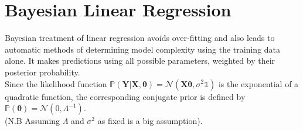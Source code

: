 \documentclass[twoside]{article}
\begin{document}
\section{Bayesian Linear Regression}
Bayesian treatment of linear regression avoids over-fitting and also leads to automatic methods of determining model complexity using the training data alone. It makes predictions using all possible parameters, weighted by their posterior probability.\\
Since the likelihood function $\mathbb{P}(\boldsymbol{Y}|\boldsymbol{X},\boldsymbol{\theta}) = \mathcal{N}(\boldsymbol{X}\boldsymbol{\theta}, \sigma^2\mathds{1})$ is the exponential of a quadratic function, the corresponding conjugate prior is defined by $\mathbb{P}(\boldsymbol{\theta}) = \mathcal{N}(0,\Lambda^{-1})$.\\
(N.B Assuming $\Lambda$ and $\sigma^2$ as fixed is a big assumption).\medskip
\end{document}

